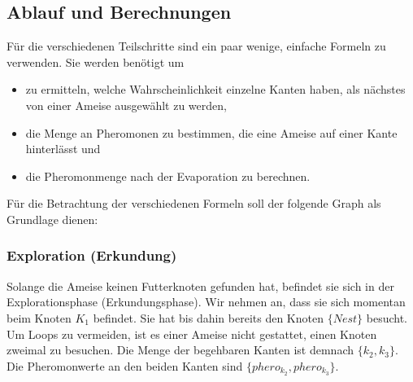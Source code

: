 \subsection{Ablauf und Berechnungen}

Für die verschiedenen Teilschritte sind ein paar wenige, einfache Formeln zu verwenden. Sie werden benötigt um

\begin{itemize}
\item zu ermitteln, welche Wahrscheinlichkeit einzelne Kanten haben, als nächstes von einer Ameise ausgewählt zu werden,
\item die Menge an Pheromonen zu bestimmen, die eine Ameise auf einer Kante hinterlässt und
\item die Pheromonmenge nach der Evaporation zu berechnen.
\end{itemize}

\noindent
Für die Betrachtung der verschiedenen Formeln soll der folgende Graph als Grundlage dienen: \\


\subsubsection*{Exploration (Erkundung)}

Solange die Ameise keinen Futterknoten gefunden hat, befindet sie sich in der Explorationsphase (Erkundungsphase). Wir nehmen an, dass sie sich momentan beim Knoten $K_1$ befindet. Sie hat bis dahin bereits den Knoten $\{Nest\}$ besucht. Um Loops zu vermeiden, ist es einer Ameise nicht gestattet, einen Knoten zweimal zu besuchen. Die Menge der begehbaren Kanten ist demnach $\{k_2, k_3\}$. Die Pheromonwerte an den beiden Kanten sind $\{phero_{k_2}, phero_{k_3}\}$. 

